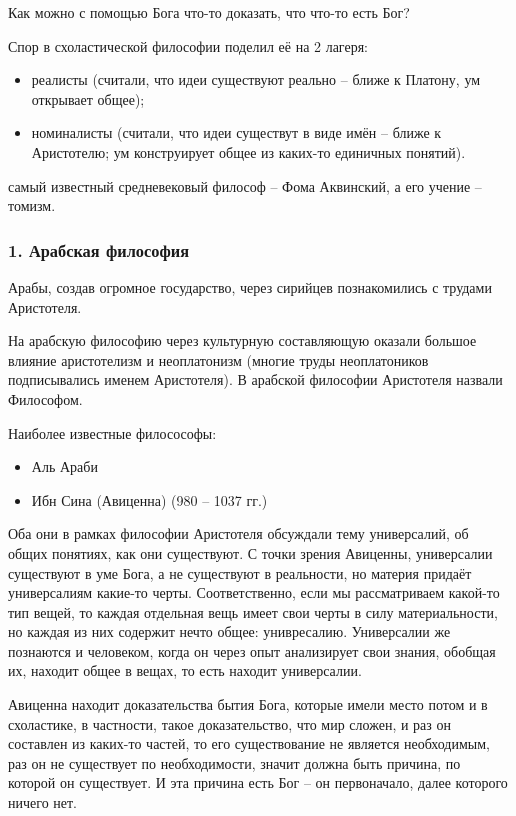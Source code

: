 \documentclass[a4paper, 12pt]{book} %
\begin{document}
Как можно с помощью Бога что-то доказать, что что-то есть Бог?

Спор в схоластической философии поделил её на 2 лагеря:
\begin{itemize}
\item реалисты (считали, что идеи существуют реально -- ближе к Платону, ум открывает общее); 
\item номиналисты (считали, что идеи существут в виде имён -- ближе к Аристотелю; ум конструирует общее из каких-то единичных понятий).
\end{itemize}

самый известный средневековый философ -- Фома Аквинский, а его учение -- томизм.

\subsubsection*{1. Арабская философия}
Арабы, создав огромное государство, через сирийцев познакомились с трудами Аристотеля.

На арабскую философию через культурную составляющую оказали большое влияние аристотелизм и неоплатонизм (многие труды неоплатоников подписывались именем Аристотеля). В арабской философии Аристотеля назвали Философом.

Наиболее известные филосософы:
\begin{itemize}	
\item Аль Араби
\item Ибн Сина (Авиценна) (980 -- 1037 гг.)
\end{itemize}
Оба они в рамках философии Аристотеля обсуждали тему универсалий, об общих понятиях, как они существуют. С точки зрения Авиценны, универсалии существуют в уме Бога, а не существуют в реальности, но материя придаёт универсалиям какие-то черты. Соответственно, если мы рассматриваем какой-то тип вещей, то каждая отдельная вещь имеет свои черты в силу материальности, но каждая из них содержит нечто общее: унивресалию. Универсалии же познаются и человеком, когда он через опыт анализирует свои знания, обобщая их, находит общее в вещах, то есть находит универсалии.

Авиценна находит доказательства бытия Бога, которые имели место потом и в схоластике, в частности, такое доказательство, что мир сложен, и раз он составлен из каких-то частей, то его существование не является необходимым, раз он не существует по необходимости, значит должна быть причина, по которой он существует. И эта причина есть Бог -- он первоначало, далее которого ничего нет.
\end{document}
